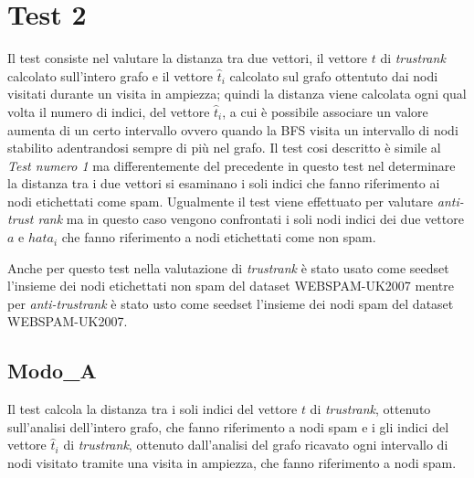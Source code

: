 \section{Test 2}
Il test consiste nel valutare la distanza tra due vettori, il vettore \(t\) di \textit{trustrank} calcolato sull'intero grafo e il vettore \(\hat{t}_i\) calcolato sul grafo ottentuto dai nodi visitati durante un visita in ampiezza; quindi la distanza viene calcolata ogni qual volta il numero di indici, del vettore \(\hat{t}_i\), a cui è possibile associare un valore aumenta  di un certo intervallo ovvero  quando la BFS visita un intervallo di nodi stabilito adentrandosi sempre di più nel grafo. Il test cosi descritto è simile al \textit{Test numero 1} ma differentemente del precedente in questo test nel determinare la distanza tra i due vettori si esaminano i soli indici che fanno riferimento ai nodi etichettati come spam. Ugualmente il test viene effettuato per valutare \textit{anti-trust rank} ma in questo caso vengono confrontati i soli nodi indici dei due vettore \(a\) e \(hat{a}_i\) che fanno riferimento a nodi etichettati come non spam.

Anche per questo test nella valutazione di \textit{trustrank} è stato usato come seedset l'insieme dei nodi etichettati non spam del dataset WEBSPAM-UK2007 mentre per \textit{anti-trustrank} è stato usto come seedset l'insieme dei nodi spam del dataset WEBSPAM-UK2007.

\subsection{Modo\_A}
Il test calcola la distanza tra i soli indici del vettore \(t\) di \textit{trustrank}, ottenuto sull'analisi dell'intero grafo, che fanno riferimento a nodi spam e i gli indici del vettore \(\hat{t}_i\) di \textit{trustrank}, ottenuto dall'analisi del grafo ricavato ogni intervallo di nodi visitato tramite una visita in ampiezza, che fanno riferimento a nodi spam.

